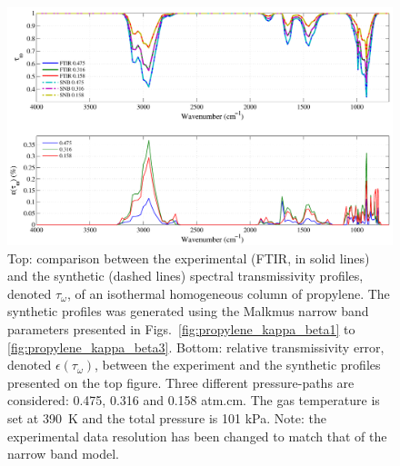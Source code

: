 \begin{figure}[p]
\includegraphics[width=\textwidth]{Figures/Comparison_Fit_Propylene_MALKMUS_Temp390K.pdf}
\caption{Top: comparison between the experimental (FTIR, in solid lines) and the synthetic (dashed lines) spectral transmissivity profiles, denoted $\tau_{\omega}$, of an isothermal homogeneous column of propylene. The synthetic profiles was generated using the Malkmus narrow band parameters presented in Figs.~\ref{fig:propylene_kappa_beta1} to \ref{fig:propylene_kappa_beta3}. Bottom: relative transmissivity error, denoted $\epsilon{(\tau_{\omega})}$, between the experiment and the synthetic profiles presented on the top figure. Three different pressure-paths are considered: 0.475, 0.316 and 0.158 atm.cm. The gas temperature is set at 390~K and the total pressure is 101 kPa. Note: the experimental data resolution has been changed to match that of the narrow band model. \label{fig:propylene_SNBVerify_390K}}
\end{figure}

